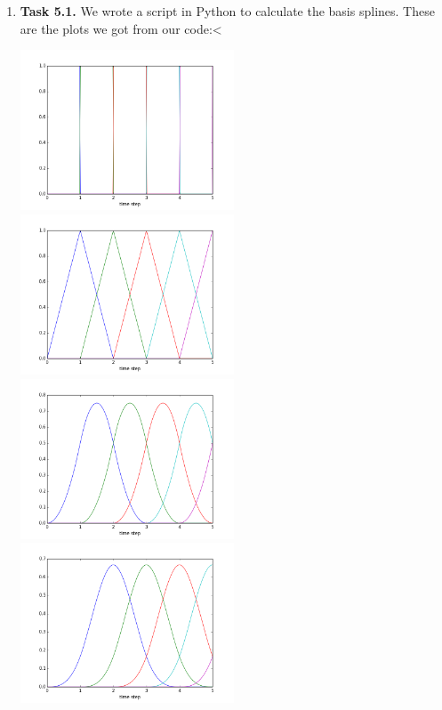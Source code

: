 \documentclass[a4paper,11pt]{article}
\author{\authorinfo}
\title{\titleinfo}
\date{\today}
\begin{document}
\maketitle
\begin {enumerate}
	\item[\textbf{Task 5.1.}]
		We wrote a script in Python to calculate the basis splines. These are the plots we got from our code:<
		
		\includegraphics[width=0.5\textwidth]{5-1-k=1}
		\includegraphics[width=0.5\textwidth]{5-1-k=2}
		\includegraphics[width=0.5\textwidth]{5-1-k=3}
		\includegraphics[width=0.5\textwidth]{5-1-k=4}
		

\end{enumerate}
\end{document}

